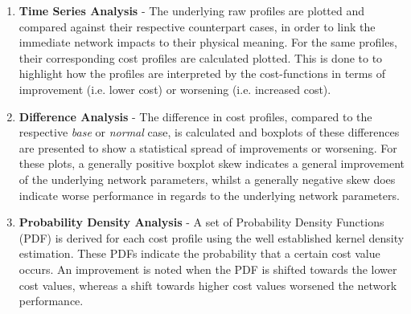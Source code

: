 \begin{enumerate}
	\item \textbf{Time Series Analysis} - 
	The underlying raw profiles are plotted and compared against their respective counterpart cases, in order to link the immediate network impacts to their physical meaning.
	For the same profiles, their corresponding cost profiles are calculated plotted.
	This is done to to highlight how the profiles are interpreted by the cost-functions in terms of improvement (i.e. lower cost) or worsening (i.e. increased cost).
	\item \textbf{Difference Analysis} - 
	The difference in cost profiles, compared to the respective \textit{base} or \textit{normal} case, is calculated and boxplots of these differences are presented to show a statistical spread of improvements or worsening.
	For these plots, a generally positive boxplot skew indicates a general improvement of the underlying network parameters, whilst a generally negative skew does indicate worse performance in regards to the underlying network parameters.
	\item \textbf{Probability Density Analysis} - 
	A set of Probability Density Functions (PDF) is derived for each cost profile using the well established kernel density estimation.
	These PDFs indicate the probability that a certain cost value occurs.
	An improvement is noted when the PDF is shifted towards the lower cost values, whereas a shift towards higher cost values worsened the network performance.
\end{enumerate}





